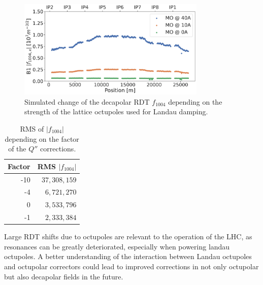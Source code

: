 \begin{figure}[!htb]
    \centering
    \includegraphics[width=0.8\textwidth]{./images/f1004/f1004_mo.pdf}
    \caption{Simulated change of the decapolar RDT $f_{1004}$ depending on the strength of the
    lattice octupoles used for Landau damping.}
    \label{fig:decapoles:rdts:simulation_mo_powered}
\end{figure}


\begin{table}[!htb]
    \centering
    \begin{tabular}{rr}
    \toprule
    Factor & RMS $|f_{1004}|$ \\
    \midrule
       -10 & $37,308,159$         \\ 
        -4 &  $6,721,270$          \\ 
         0 &  $3,533,796$          \\ 
        -1 &  $2,333,384$          \\
    \bottomrule
    \end{tabular}
    \caption{RMS of $|f_{1004}|$ depending on the factor of the $Q''$ corrections.}
    \label{table:decapoles:corrections_dq2_f1004_rms}
\end{table}

Large RDT shifts due to octupoles are relevant to the operation of the LHC, as
resonances can be greatly deteriorated, especially when powering landau octupoles.
A better understanding of the interaction between Landau octupoles and octupolar correctors could
lead to improved corrections in not only octupolar but also decapolar fields in the future.



\subsubsection{}


